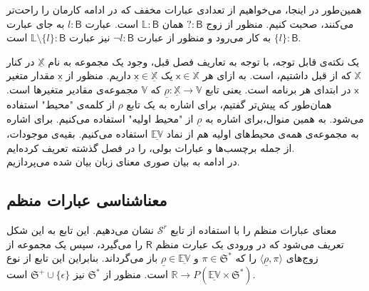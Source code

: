 همین‌طور در اینجا، می‌خواهیم از تعدادی عبارات مخفف که در ادامه کارمان را راحت‌تر می‌کنند، صحبت کنیم. منظور از زوج 
$\mathsf{? : B}$
همان 
$\mathbb{L}\mathsf{ : B}$
است. عبارت 
$l : \mathsf{B}$
به جای عبارت 
$\{l\} : \mathsf{B}$
به کار می‌رود و منظور از عبارت 
$\neg l \mathsf{: B}$
نیز عبارت 
$\mathbb{L}\setminus\{l\}:\mathsf{B}$
است.

یک نکته‌ی قابل توجه، با توجه به تعاریف فصل قبل، وجود یک مجموعه به نام
$\mathbb{\underline{X}}$
در کنار 
$\mathbb{X}$
که از قبل داشتیم، است. به ازای هر 
$\mathsf{x}\in\mathbb{X}$
یک 
$\mathsf{\underline{x}}\in\mathbb{\underline{X}}$
داریم. منظور از 
$\mathsf{\underline{x}}$
مقدار متغیر 
$\mathsf{x}$
در ابتدای هر برنامه است. یعنی تابع
$\underline{\rho}: \mathbb{\underline{X}} \rightarrow \mathbb{V}$
که 
$\mathbb{V}$
مجموعه‌ی مقادیر متغیرها است. همان‌طور که پیش‌تر گفتیم، برای اشاره به یک تابع
$\rho$
از کلمه‌ی "محیط" استفاده می‌شود. به همین منوال،برای اشاره‌ به 
$\underline{\rho}$
از "محیط اولیه" استفاده می‌کنیم. برای اشاره به مجموعه‌ی همه‌ی محیط‌های اولیه هم از نماد 
$\underline{\mathbb{EV}}$
استفاده می‌کنیم.
بقیه‌ی موجودات، از جمله برچسب‌ها و عبارات بولی، را در فصل گذشته تعریف کرده‌ایم.\\
در ادامه به بیان صوری معنای زبان بیان شده می‌پردازیم.\\

\subsection{معناشناسی عبارات منظم}
معنای عبارات منظم را با استفاده از تابع 
$\mathcal{S}^r$
نشان می‌دهیم. این تابع به این شکل تعریف می‌شود که در ورودی یک عبارت منظم 
$\mathsf{R}$
را می‌گیرد، سپس یک مجموعه از زوج‌های
$\langle\underline{\rho} , \pi\rangle$
را که 
$\pi \in \mathfrak{S^*}$
و 
$\underline{\rho} \in \underline{\mathbb{EV}}$
باز می‌گرداند. بنابراین این تابع از نوع
$\mathbb{R} \rightarrow \mathit{P} (\mathbb{\underline{EV}} \times \mathfrak{S}^*)$
است.
 منظور از 
 $\mathfrak{S}^*$
 نیز 
 $\mathfrak{S}^+ \cup \{\epsilon\}$
 است.
 
